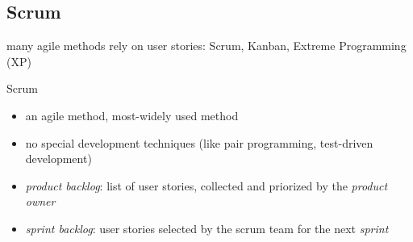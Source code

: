 \subsection{Scrum}
\begin{frame}{\insertsubsection}
	\begin{fancycolumns}[widths={45}]
		\begin{note}{}
				many agile methods rely on user stories: Scrum, Kanban, Extreme Programming (XP)
		\end{note}
		\nextcolumn
		\vspace{-10mm}
		\begin{definition}{Scrum \mysource{\sommerville}}
			\begin{itemize}
				\item an agile method, most-widely used method
				\item no special development techniques (like pair programming, test-driven development)
				\item \emph{product backlog}: list of user stories, collected and priorized by the \emph{product owner}
				\item \emph{sprint backlog}: user stories selected by the scrum team for the next \emph{sprint}
			\end{itemize}
		\end{definition}
		\begin{exampletight}{}
			\diagramScrum
		\end{exampletight}
	\end{fancycolumns}
\end{frame}

